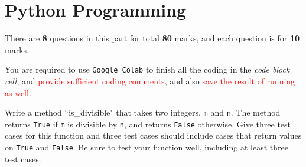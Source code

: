 \documentclass[a4paper]{article}
\begin{document}



    \part{Python Programming}\label{sec:part1}

    There are \textbf{8} questions in this part for total \textbf{80} marks, and each question is for \textbf{10} marks.

    You are required to use \texttt{Google Colab} to
    finish all the coding in the \textit{code block cell},
    and \textcolor{red}{provide sufficient coding comments},
    and also \textcolor{red}{save the result of running as well}.

    \begin{answer}[Question 1.1]
        Write a method ``is_divisible" that takes two integers, \texttt{m} and \texttt{n}. The method returns \texttt{True} if \texttt{m} is divisible by \texttt{n}, and returns \texttt{False} otherwise. Give three test cases for this function and three test cases should include cases that return values on \texttt{True} and \texttt{False}.
        Be sure to test your function well, including at least three test cases.

    \end{answer}
\end{document}

